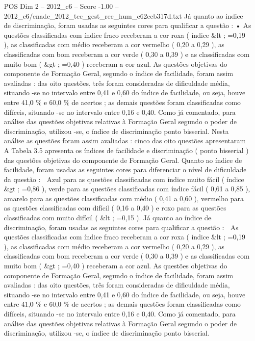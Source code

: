\begin{textsample}{POS Dim 2 – 2012\_c6 – Score -1.00 – 2012\_c6/enade\_2012\_tec\_gest\_rec\_hum\_c62ecb317d.txt}
Já quanto ao índice de discriminação, foram usadas as seguintes cores para qualificar a questão : • As questões classificadas com índice fraco receberam a cor roxa ( índice \&lt ; =0,19 ), as classificadas com médio receberam a cor vermelho ( 0,20 a 0,29 ), as classificadas com bom receberam a cor verde ( 0,30 a 0,39 ) e as classificadas com muito bom ( \&gt ; =0,40 ) receberam a cor azul.
As questões objetivas do componente de Formação Geral, segundo o índice de facilidade, foram assim avaliadas : das oito questões, três foram consideradas de dificuldade média, situando -se no intervalo entre 0,41 e 0,60 do índice de facilidade, ou seja, houve entre 41,0 \% e 60,0 \% de acertos ; as demais questões foram classificadas como difíceis, situando -se no intervalo entre 0,16 e 0,40.
Como já comentado, para análise das questões objetivas relativas à Formação Geral segundo o poder de discriminação, utilizou -se, o índice de discriminação ponto bisserial.
Nesta análise as questões foram assim avaliadas : cinco das oito questões apresentaram A Tabela 3.5 apresenta os índices de facilidade e discriminação ( ponto bisserial ) das questões objetivas do componente de Formação Geral.
Quanto ao índice de facilidade, foram usadas as seguintes cores para diferenciar o nível de dificuldade da questão :  Azul para as questões classificadas com índice muito fácil ( índice \&gt ; =0,86 ), verde para as questões classificadas com índice fácil ( 0,61 a 0,85 ), amarelo para as questões classificadas com médio ( 0,41 a 0,60 ), vermelho para as questões classificadas com difícil ( 0,16 a 0,40 ) e roxo para as questões classificadas com muito difícil ( \&lt ; =0,15 ).
Já quanto ao índice de discriminação, foram usadas as seguintes cores para qualificar a questão :  As questões classificadas com índice fraco receberam a cor roxa ( índice \&lt ; =0,19 ), as classificadas com médio receberam a cor vermelho ( 0,20 a 0,29 ), as classificadas com bom receberam a cor verde ( 0,30 a 0,39 ) e as classificadas com muito bom ( \&gt ; =0,40 ) receberam a cor azul.
As questões objetivas do componente de Formação Geral, segundo o índice de facilidade, foram assim avaliadas : das oito questões, três foram consideradas de dificuldade média, situando -se no intervalo entre 0,41 e 0,60 do índice de facilidade, ou seja, houve entre 41,0 \% e 60,0 \% de acertos ; as demais questões foram classificadas como difíceis, situando -se no intervalo entre 0,16 e 0,40.
Como já comentado, para análise das questões objetivas relativas à Formação Geral segundo o poder de discriminação, utilizou -se, o índice de discriminação ponto bisserial.

\end{textsample}
